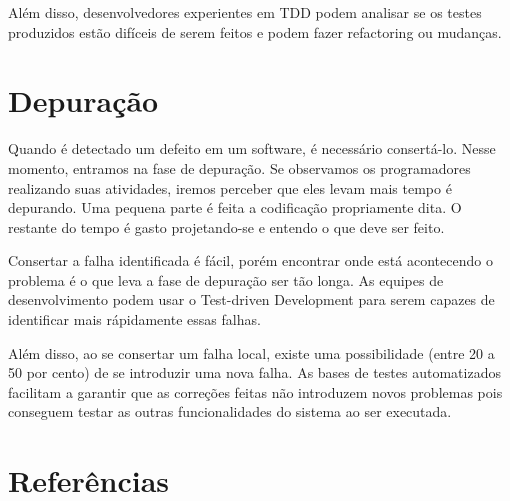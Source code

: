 \documentclass[12pt]{article}
\begin{document}
  Além disso, desenvolvedores experientes em TDD podem analisar se os testes 
  produzidos estão difíceis de serem feitos e podem fazer refactoring ou 
  mudanças.

  \section{Depuração}

  Quando é detectado um defeito em um software, é necessário consertá-lo. Nesse
  momento, entramos na fase de depuração. Se observamos os programadores 
  realizando suas atividades, iremos perceber que eles levam mais tempo é 
  depurando. Uma pequena parte é feita a codificação propriamente dita. O 
  restante do tempo é gasto projetando-se e entendo o que deve ser feito.

  Consertar a falha identificada é fácil, porém encontrar onde está acontecendo
  o problema é o que leva a fase de depuração ser tão longa. As equipes de 
  desenvolvimento podem usar o Test-driven Development para serem capazes de
  identificar mais rápidamente essas falhas.

  Além disso, ao se consertar um falha local, existe uma possibilidade (entre
  20 a 50 por cento) de se introduzir uma nova falha. As bases de testes 
  automatizados facilitam a garantir que as correções feitas não introduzem 
  novos problemas pois conseguem testar as outras funcionalidades do sistema
  ao ser executada.

  \section{Referências}
\end{document}
